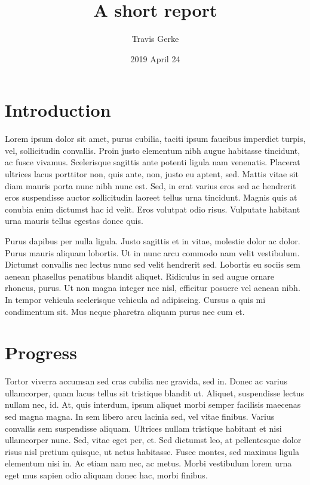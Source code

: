 \documentclass[]{article}
\title{A short report}
\author{Travis Gerke}
\date{2019 April 24}
\begin{document}
\maketitle

\hypertarget{introduction}{%
\section{Introduction}\label{introduction}}

Lorem ipsum dolor sit amet, purus cubilia, taciti ipsum faucibus
imperdiet turpis, vel, sollicitudin convallis. Proin justo elementum
nibh augue habitasse tincidunt, ac fusce vivamus. Scelerisque sagittis
ante potenti ligula nam venenatis. Placerat ultrices lacus porttitor
non, quis ante, non, justo eu aptent, sed. Mattis vitae sit diam mauris
porta nunc nibh nunc est. Sed, in erat varius eros sed ac hendrerit eros
suspendisse auctor sollicitudin laoreet tellus urna tincidunt. Magnis
quis at conubia enim dictumst hac id velit. Eros volutpat odio risus.
Vulputate habitant urna mauris tellus egestas donec quis.

Purus dapibus per nulla ligula. Justo sagittis et in vitae, molestie
dolor ac dolor. Purus mauris aliquam lobortis. Ut in nunc arcu commodo
nam velit vestibulum. Dictumst convallis nec lectus nunc sed velit
hendrerit sed. Lobortis eu sociis sem aenean phasellus penatibus blandit
aliquet. Ridiculus in sed augue ornare rhoncus, purus. Ut non magna
integer nec nisl, efficitur posuere vel aenean nibh. In tempor vehicula
scelerisque vehicula ad adipiscing. Cursus a quis mi condimentum sit.
Mus neque pharetra aliquam purus nec cum et.

\hypertarget{progress}{%
\section{Progress}\label{progress}}

Tortor viverra accumsan sed cras cubilia nec gravida, sed in. Donec ac
varius ullamcorper, quam lacus tellus sit tristique blandit ut. Aliquet,
suspendisse lectus nullam nec, id. At, quis interdum, ipsum aliquet
morbi semper facilisis maecenas sed magna magna. In sem libero arcu
lacinia sed, vel vitae finibus. Varius convallis sem suspendisse
aliquam. Ultrices nullam tristique habitant et nisi ullamcorper nunc.
Sed, vitae eget per, et. Sed dictumst leo, at pellentesque dolor risus
nisl pretium quisque, ut netus habitasse. Fusce montes, sed maximus
ligula elementum nisi in. Ac etiam nam nec, ac metus. Morbi vestibulum
lorem urna eget mus sapien odio aliquam donec hac, morbi finibus.
\end{document}
